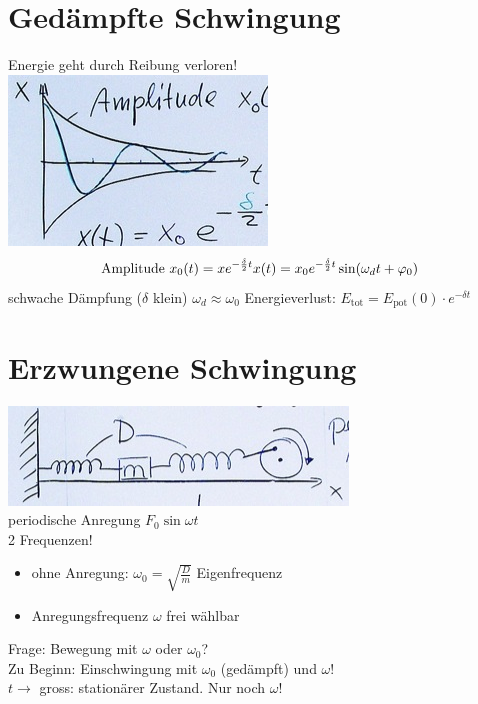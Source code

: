 \section{Gedämpfte Schwingung}
Energie geht durch Reibung verloren! \\
\includegraphics{Bild216}
\[
	\text{Amplitude } x_0(t) = x e^{-\frac{\delta}{2} t} \\
	x(t) = x_0 e^{-\frac{\delta}{2} t} \sin( \omega_d t + \phi_0 )
\]
schwache Dämpfung ($\delta$ klein) $\omega_d \approx \omega_0$
Energieverlust: $E_{\text{tot}} = E_{\text{pot}}( 0 ) \cdot e^{-\delta t}$

\section{Erzwungene Schwingung}
\includegraphics{Bild217} \\
periodische Anregung $F_0 \sin \omega t$ \\
2 Frequenzen!
\begin{itemize}
	\item ohne Anregung: $\omega_0 = \sqrt{\frac{D}{m}}$ Eigenfrequenz
	\item Anregungsfrequenz $\omega$ frei wählbar
\end{itemize}
Frage: Bewegung mit $\omega$ oder $\omega_0$? \\
Zu Beginn: Einschwingung mit $\omega_0$ (gedämpft) und $\omega$! \\
$t \rightarrow$ gross: stationärer Zustand. Nur noch $\omega$!

